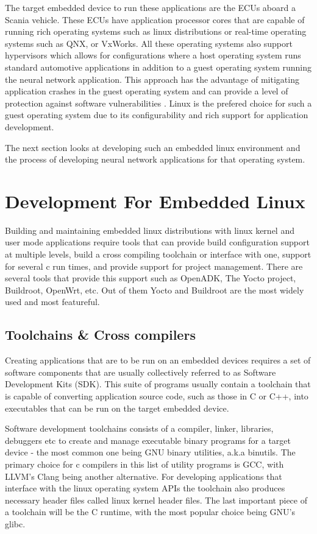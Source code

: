 The target embedded device to run these applications are the ECUs aboard a Scania vehicle. These ECUs have application processor cores that are capable of running rich operating systems such as linux distributions or real-time operating systems such as QNX, or VxWorks. All these operating systems also support hypervisors which allows for configurations where a host operating system runs standard automotive applications in addition to a guest operating system running the neural network application. This approach has the advantage of mitigating application crashes in the guest operating system and can provide a level of protection against software vulnerabilities \cite{linux-guest-os}. Linux is the prefered choice for such a guest operating system due to its configurability and rich support for application development.

The next section looks at developing such an embedded linux environment and the process of developing neural network applications for that operating system.

\section[Development Process for Embedded Linux]{Development For Embedded Linux}

Building and maintaining embedded linux distributions with linux kernel and user mode applications require tools that can provide build configuration support at multiple levels, build a cross compiling toolchain or interface with one, support for several c run times, and provide support for project management. There are several tools that provide this support such as OpenADK, The Yocto project, Buildroot, OpenWrt, etc. Out of them Yocto and Buildroot are the most widely used and most featureful.

\subsection[SDKs \& Compiler Toolchains]{Toolchains \& Cross compilers}

Creating applications that are to be run on an embedded devices requires a set of software components that are usually collectively referred to as Software Development Kits (SDK). This suite of programs usually contain a toolchain that is capable of converting application source code, such as those in C or C++, into executables that can be run on the target embedded device.

Software development toolchains consists of a compiler, linker, libraries, debuggers etc to create and manage executable binary programs for a target device - the most common one being GNU binary utilities, a.k.a binutils. The primary choice for c compilers in this list of utility programs is GCC, with LLVM's Clang being another alternative. For developing applications that interface with the linux operating system APIs the toolchain also produces necessary header files called linux kernel header files. The last important piece of a toolchain will be the C runtime, with the most popular choice being GNU's glibc.

